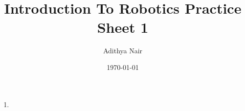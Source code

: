 \documentclass[11pt]{article}
\author{Adithya Nair}
\date{\today}
\title{Introduction To Robotics Practice Sheet 1}
\begin{document}
\maketitle

\begin{enumerate}
	\item
\end{enumerate}
\end{document}

